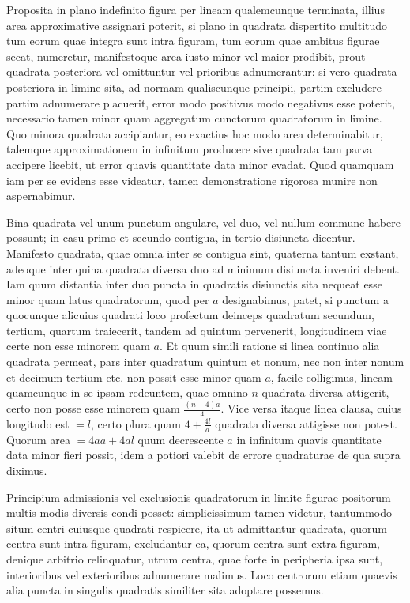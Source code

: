 Proposita in plano indefinito figura per lineam qualemcunque terminata, illius area approximative assignari poterit, si plano in quadrata dispertito multitudo tum eorum quae integra sunt intra figuram, tum eorum quae ambitus figurae secat, numeretur, manifestoque area iusto minor vel maior prodibit, prout quadrata posteriora vel omittuntur vel prioribus adnumerantur: si vero quadrata posteriora in limine sita, ad normam qualiscunque principii, partim excludere partim adnumerare placuerit, error modo positivus modo negativus esse poterit, necessario tamen minor quam aggregatum cunctorum quadratorum in limine. Quo minora quadrata accipiantur, eo exactius hoc modo area determinabitur, talemque approximationem in infinitum producere sive quadrata tam parva accipere licebit, ut error quavis quantitate data minor evadat. Quod quamquam iam per se evidens esse videatur, tamen demonstratione rigorosa munire non aspernabimur.

Bina quadrata vel unum punctum angulare, vel duo, vel nullum commune habere possunt; in casu primo et secundo contigua, in tertio disiuncta dicentur. Manifesto quadrata, quae omnia inter se contigua sint, quaterna tantum exstant, adeoque inter quina quadrata diversa duo ad minimum disiuncta inveniri debent. Iam quum distantia inter duo puncta in quadratis disiunctis sita nequeat esse minor quam latus quadratorum, quod per $a$ designabimus, patet, si punctum a quocunque alicuius quadrati loco profectum deinceps quadratum secundum, tertium, quartum traiecerit, tandem ad quintum pervenerit, longitudinem viae certe non esse minorem quam $a$. Et quum simili ratione si linea continuo alia quadrata permeat, pars inter quadratum quintum et nonum, nec non inter nonum et decimum tertium etc. non possit esse minor quam $a$, facile colligimus, lineam quamcunque in se ipsam redeuntem, quae omnino $n$ quadrata diversa attigerit, certo non posse esse minorem quam $\frac{(n-4)a}4$. Vice versa itaque linea clausa, cuius longitudo est $=l$, certo plura quam $4+\frac{4l}a$ quadrata diversa attigisse non potest. Quorum area $=4aa+4al$ quum decrescente $a$ in infinitum quavis quantitate data minor fieri possit, idem a potiori valebit de errore quadraturae de qua supra diximus.

%
Principium admissionis vel exclusionis quadratorum in limite figurae positorum multis modis diversis condi posset: simplicissimum tamen videtur, tantummodo situm centri cuiusque quadrati respicere, ita ut admittantur quadrata, quorum centra sunt intra figuram, excludantur ea, quorum centra sunt extra figuram, denique arbitrio relinquatur, utrum centra, quae forte in peripheria ipsa sunt, interioribus vel exterioribus adnumerare malimus. Loco centrorum etiam quaevis alia puncta in singulis quadratis similiter sita adoptare possemus.

